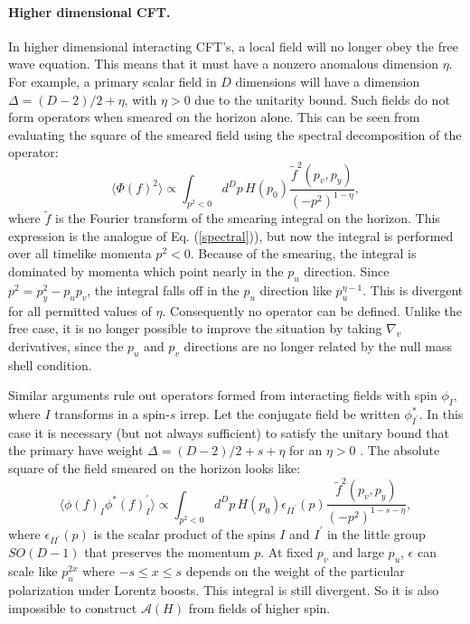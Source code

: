 \documentclass{article}
\begin{document}
\paragraph{\textbf{Higher dimensional CFT.}}  In higher dimensional interacting CFT's, a local field will no longer obey the free wave equation.  This means that it must have a nonzero anomalous dimension $\eta$.  For example, a primary scalar field in $D$ dimensions will have a dimension $\Delta = (D - 2)/2 + \eta$, with $\eta > 0$ due to the unitarity bound.  Such fields do not form operators when smeared on the horizon alone.  This can be seen from evaluating the square of the smeared field using the spectral decomposition of the operator:
\begin{equation}
\langle \Phi(f)^2 \rangle \propto
\int_{p^2 < 0} d^{D}p\,H(p_0) \frac{\tilde{f}^2(p_v, p_y)}{(-p^2)^{1 - \eta}},
\end{equation}
where $\tilde{f}$ is the Fourier transform of the smearing integral on the horizon.  This expression is the analogue of Eq. (\ref{spectral})), but now the integral is performed over all timelike momenta $p^2 < 0$.  Because of the smearing, the integral is dominated by momenta which point nearly in the $p_u$ direction.  Since $p^2 = p_y^2 - p_u p_v$, the integral falls off in the $p_u$ direction like $p_u^{\eta - 1}$.  This is divergent for all permitted values of $\eta$.  Consequently no operator can be defined.  Unlike the free case, it is no longer possible to improve the situation by taking $\nabla_v$ derivatives, since the $p_u$ and $p_v$ directions are no longer related by the null mass shell condition.

Similar arguments rule out operators formed from interacting fields with spin $\phi_I$, where $I$ transforms in a spin-$s$ irrep.  Let the conjugate field be written $\phi^*_{I^\prime}$.  In this case it is necessary (but not always sufficient) to satisfy the unitary bound that the primary have weight $\Delta = (D - 2)/2 + s + \eta$ for an $\eta > 0$ \cite{mack}.  The absolute square of the field smeared on the horizon looks like:
\begin{equation}
\langle \phi(f)_I \phi^* (f)_I^\prime \rangle \propto
\int_{p^2 < 0} d^{D}p\,H(p_0) \epsilon_{II^\prime}(p)
\frac{\tilde{f}^2(p_v, p_y)}{(-p^2)^{1 - s - \eta}},
\end{equation}
where $\epsilon_{II^\prime}(p)$ is the scalar product of the spins $I$ and $I^\prime$ in the little group $SO(D - 1)$ that preserves the momentum $p$.  At fixed $p_v$ and large $p_u$, $\epsilon$ can scale like $p_u^{2x}$ where $-s \le x \le s$ depends on the weight of the particular polarization under Lorentz boosts.  This integral is still divergent.  So it is also impossible to construct $\mathcal{A}(H)$ from fields of higher spin.
\end{document}
